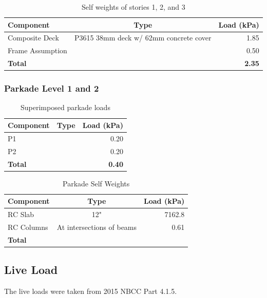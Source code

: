 \documentclass[12pt]{article}
\begin{document}
\begin{table}[h!]
    \centering
    \caption{Self weights of stories 1, 2, and 3}
    \label{tab:self123}
    \begin{tabular}{lcr}
        \toprule
        \textbf{Component} & \textbf{Type} & \textbf{Load (kPa)}\\
        \midrule
        Composite Deck & P3615 38mm deck w/ 62mm concrete cover & 1.85\\
        Frame Assumption &  & 0.50\\
        \textbf{Total} & & \textbf{2.35}\\
        \bottomrule
    \end{tabular}
\end{table}

\subsubsection{Parkade Level 1 and 2}

\begin{table}[h!]
    \centering
    \caption{Superimposed parkade loads}
    \label{tab:superPark}
    \begin{tabular}{lcr}
        \toprule
        \textbf{Component} & \textbf{Type} & \textbf{Load (kPa)}\\
        \midrule
        P1 &  & 0.20\\
        P2 &  & 0.20\\
        \textbf{Total} & & \textbf{0.40}\\
        \bottomrule
    \end{tabular}
\end{table}

\begin{table}[h!]
    \centering
    \caption{Parkade Self Weights}
    \label{tab:selfPark}
    \begin{tabular}{lcr}
        \toprule
        \textbf{Component} & \textbf{Type} & \textbf{Load (kPa)}\\
        \midrule
        RC Slab & 12" & 7162.8\\
        RC Columns & At intersections of beams & 0.61\\
        \textbf{Total} & & \textbf{}\\
        \bottomrule
    \end{tabular}
\end{table}

\subsection{Live Load}
The live loads were taken from 2015 NBCC Part 4.1.5.
\end{document}
